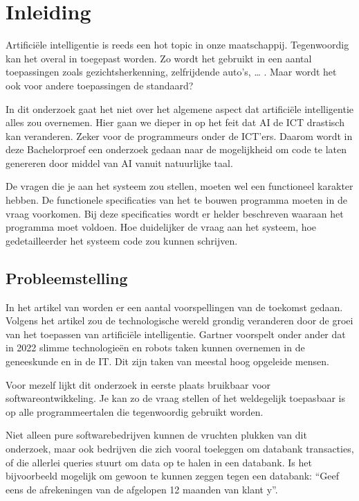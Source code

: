 
\chapter*{Inleiding}
\label{ch:inleiding}

Artificiële intelligentie is reeds een hot topic in onze maatschappij. Tegenwoordig kan het overal in toegepast worden. Zo wordt het gebruikt in een aantal toepassingen zoals gezichtsherkenning, zelfrijdende auto’s, … . Maar wordt het ook voor andere toepassingen de standaard?

In dit onderzoek gaat het niet over het algemene aspect dat artificiële intelligentie alles zou overnemen. Hier gaan we dieper in op het feit dat AI de ICT drastisch kan veranderen. Zeker voor de programmeurs onder de ICT’ers. Daarom wordt in deze Bachelorproef een onderzoek gedaan naar de mogelijkheid om code te laten genereren door middel van AI vanuit natuurlijke taal. 

De vragen die je aan het systeem zou stellen, moeten wel een functioneel karakter hebben. De functionele specificaties van het te bouwen programma moeten in de vraag voorkomen. Bij deze specificaties wordt er helder beschreven waaraan het programma moet voldoen. Hoe duidelijker de vraag aan het systeem, hoe gedetailleerder het systeem code zou kunnen schrijven.  

\section{Probleemstelling}
\label{sec:probleemstelling}

In het artikel van \textcite{Gartner} worden er een aantal voorspellingen van de toekomst gedaan. Volgens het artikel zou de technologische wereld grondig veranderen door de groei van het toepassen van artificiële intelligentie.  Gartner voorspelt onder ander dat in 2022 slimme technologieën en robots taken kunnen overnemen in de geneeskunde en in de IT. Dit zijn taken van meestal hoog opgeleide mensen.



Voor mezelf lijkt dit onderzoek in eerste plaats bruikbaar voor softwareontwikkeling. Je kan zo de vraag stellen of het weldegelijk toepasbaar is op alle programmeertalen die tegenwoordig gebruikt worden. 

Niet alleen pure softwarebedrijven kunnen de vruchten plukken van dit onderzoek, maar ook bedrijven die zich vooral toeleggen om databank transacties, of die allerlei queries stuurt om data op te halen in een databank. Is het bijvoorbeeld mogelijk om gewoon te kunnen zeggen tegen een databank: “Geef eens de afrekeningen van de afgelopen 12 maanden van klant y”. 

